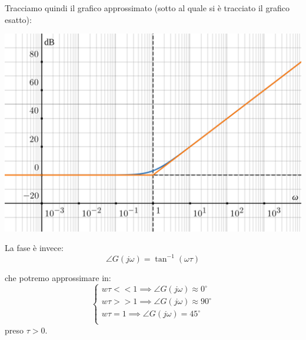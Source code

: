 \documentclass[a4paper,11pt]{article}
\begin{document}
\par\bigskip

\noindent
\begin{minipage}{\textwidth}
Tracciamo quindi il grafico approssimato (sotto al quale si è tracciato il grafico esatto):
\begin{center}
	\includegraphics[scale=0.3]{../figures/rdifferentiator_bode/mod.png} 
\end{center}
\end{minipage}

\par\bigskip

La fase è invece:
$$
\angle G(j \omega) = \tan^{-1} (\omega \tau)
$$

che potremo approssimare in:
\[
	\begin{cases}
		w \tau << 1 \implies \angle G(j\omega) \approx 0^\circ \\ 	
		w \tau >> 1 \implies \angle G(j\omega) \approx 90^\circ \\ 	
		w \tau = 1 \implies \angle G(j\omega) = 45^\circ \\ 	
	\end{cases}
\]
preso $\tau > 0$.

\par\bigskip
\end{document}
